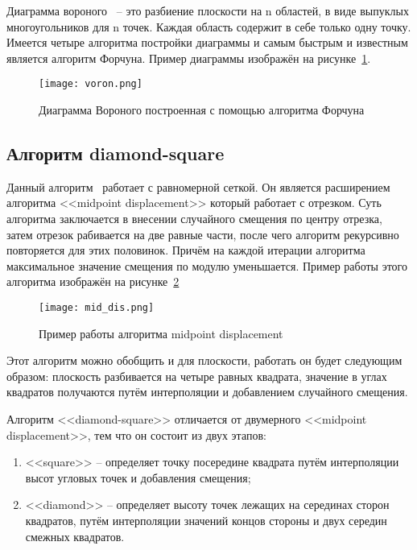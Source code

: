 Диаграмма вороного~\cite{voronoi} – это разбиение плоскости на n областей, в виде выпуклых многоугольников для n точек. Каждая область содержит в себе только одну точку. Имеется четыре алгоритма постройки диаграммы и самым быстрым и известным является алгоритм Форчуна. Пример диаграммы изображён на рисунке~\ref{fig:voron}.


\begin{figure}[H]
	\centering
	\texttt{[image: voron.png]}
	\caption{Диаграмма Вороного построенная с помощью алгоритма Форчуна}
	\label{fig:voron}
\end{figure}

\subsection{Алгоритм diamond-square}

Данный алгоритм~\cite{diamond_square} работает с равномерной сеткой. Он является расширением алгоритма <<midpoint displacement>> который работает с отрезком. Суть алгоритма заключается в внесении случайного смещения по центру отрезка, затем отрезок рабивается на две равные части, после чего алгоритм рекурсивно повторяется для этих половинок. Причём на каждой итерации алгоритма максимальное значение смещения по модулю уменьшается. Пример работы этого алгоритма изображён на рисунке~\ref{fig:mid_dis}

\begin{figure}[H]
	\centering
	\texttt{[image: mid\_dis.png]}
	\caption{Пример работы алгоритма midpoint displacement}
	\label{fig:mid_dis}
\end{figure}
 
Этот алгоритм можно обобщить и для плоскости, работать он будет следующим образом: плоскость разбивается на четыре равных квадрата, значение в углах квадратов получаются путём интерполяции и добавлением случайного смещения.

Алгоритм <<diamond-square>> отличается от двумерного <<midpoint displacement>>, тем что он состоит из двух этапов:

\begin{enumerate}
	\item <<square>> -- определяет точку посередине квадрата путём интерполяции высот угловых точек и добавления смещения;
	\item <<diamond>> -- определяет высоту точек лежащих на серединах сторон квадратов, путём интерполяции значений концов стороны и двух середин смежных квадратов.
\end{enumerate}

